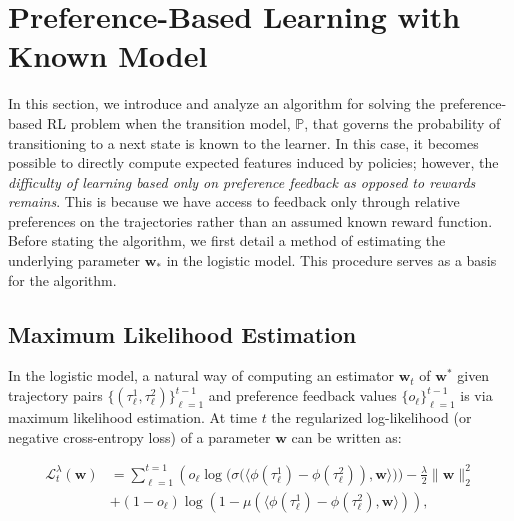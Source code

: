 \section{Preference-Based Learning with Known Model}
\label{sec:known-model}

In this section, we introduce and analyze an algorithm for solving the preference-based RL problem when the transition model, $\mathbb P$, that governs the probability of transitioning to a next state is known to the learner. In this case, it becomes possible to directly compute expected features induced by policies; however, the \emph{difficulty of learning based only on preference feedback as opposed to rewards remains}. This is because we have access to feedback only through relative preferences on the trajectories rather than an assumed known reward function. Before stating the algorithm, we first detail a method of estimating the underlying parameter ${\mathbf w}_*$ in the logistic model. This procedure serves as a basis for the algorithm.

\subsection{Maximum Likelihood Estimation} In the logistic model, a natural way of computing an estimator ${\mathbf w}_t$ of ${\mathbf w}^*$ given trajectory pairs $\{(\tau_\ell^1, \tau_\ell^2 )\}_{\ell=1}^{t-1}$ and preference feedback values $\{ o_\ell \}_{\ell=1}^{t-1}$ is via maximum likelihood estimation. At time $t$ the regularized log-likelihood (or negative cross-entropy loss) of a parameter ${\mathbf w}$ can be written as:

\begin{align*}
    \mathcal{L}_t^\lambda({\mathbf w}) &= \sum_{\ell=1}^{t=1}\left(o_\ell \log(\sigma( \langle \phi(\tau_\ell^1) - \phi(\tau_\ell^2) \right) , {\mathbf w} \rangle  )) -\frac{\lambda}{2} \| {\mathbf w} \|_2^2\\
     &+(1-o_\ell) \log\left( 1- \mu(  \langle \phi(\tau_\ell^1 ) -\phi(\tau_\ell^2) , {\mathbf w}\rangle )   \right)  ,
\end{align*}

